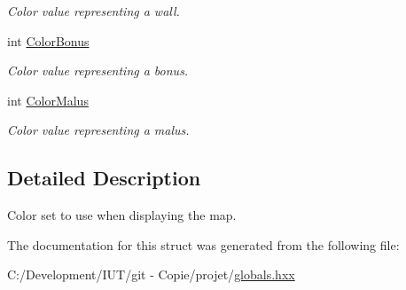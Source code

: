 \begin{DoxyCompactItemize}
\begin{DoxyCompactList}\small\item\em Color value representing a wall. \end{DoxyCompactList}\item 
\hypertarget{struct_chase_game_1_1_s_color_set_aacd34496b36640358ecae127f6bb6cc4}{int \hyperlink{struct_chase_game_1_1_s_color_set_aacd34496b36640358ecae127f6bb6cc4}{Color\-Bonus}}\label{struct_chase_game_1_1_s_color_set_aacd34496b36640358ecae127f6bb6cc4}

\begin{DoxyCompactList}\small\item\em Color value representing a bonus. \end{DoxyCompactList}\item 
\hypertarget{struct_chase_game_1_1_s_color_set_aa2eb52b7d1fb4059da9935a230715498}{int \hyperlink{struct_chase_game_1_1_s_color_set_aa2eb52b7d1fb4059da9935a230715498}{Color\-Malus}}\label{struct_chase_game_1_1_s_color_set_aa2eb52b7d1fb4059da9935a230715498}

\begin{DoxyCompactList}\small\item\em Color value representing a malus. \end{DoxyCompactList}\end{DoxyCompactItemize}


\subsection{Detailed Description}
Color set to use when displaying the map. 

The documentation for this struct was generated from the following file\-:\begin{DoxyCompactItemize}
\item 
C\-:/\-Development/\-I\-U\-T/git -\/ Copie/projet/\hyperlink{globals_8hxx}{globals.\-hxx}\end{DoxyCompactItemize}
